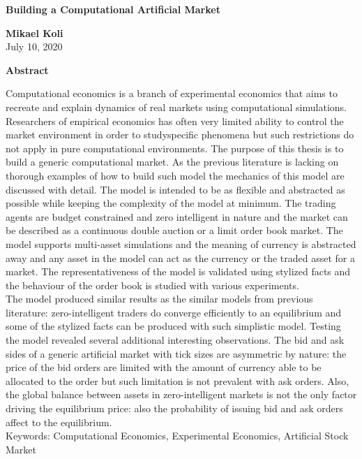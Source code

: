 \thispagestyle{plain}
\begin{center}
    \Large
    \textbf{Building a Computational Artificial Market}
        
    \vspace{0.4cm}
    \large
        
    \vspace{0.4cm}
    \textbf{Mikael Koli} \\
    July 10, 2020 %
       
    \vspace{0.9cm}
    \textbf{Abstract}
\end{center}

Computational economics is a branch of experimental economics that aims to 
recreate and explain dynamics of real markets using computational simulations. Researchers of
empirical economics has often very limited ability to control the market environment 
in order to studyspecific phenomena but such restrictions do not apply in pure computational
environments. The purpose of this thesis is to build a generic computational market. As the
previous literature is lacking on thorough examples of how to build such model the mechanics of this
model are discussed with detail. The model is intended to be as flexible and abstracted as possible 
while keeping the complexity of the model at minimum. The trading agents are budget constrained 
and zero intelligent in nature and the market can be described as a continuous double auction or a 
limit order book market. The model supports multi-asset simulations and the meaning of currency is 
abstracted away and any asset in the model can act as the currency or the traded asset for a market. 
The representativeness of the model is validated using stylized facts and the behaviour
of the order book is studied with various experiments.\\

The model produced similar results as the similar models from previous literature: zero-intelligent
traders do converge efficiently to an equilibrium and some of the stylized facts can be produced
with such simplistic model. Testing the model revealed several additional interesting observations.
The bid and ask sides of a generic artificial market with tick sizes are asymmetric by nature: the 
price of the bid orders are limited with the amount of currency able to be allocated to the order 
but such limitation is not prevalent with ask orders. Also, the global balance between assets in 
zero-intelligent markets is not the only factor driving the equilibrium price: also the probability 
of issuing bid and ask orders affect to the equilibrium.\\

Keywords: Computational Economics, Experimental Economics, Artificial Stock Market\\